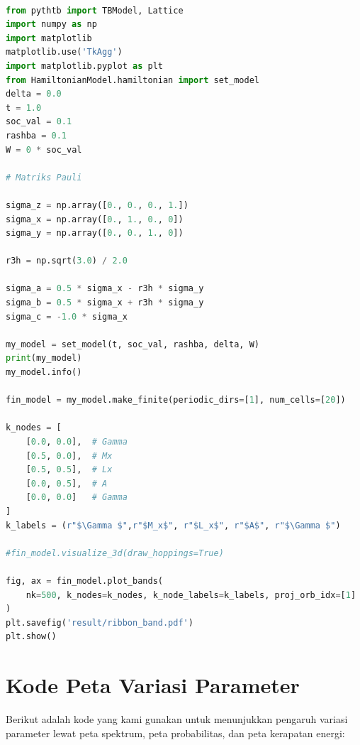 \begin{lstlisting}[language=Python, caption={Validasi \textit{Edge State}}, label={lst:vis-model}]

from pythtb import TBModel, Lattice
import numpy as np
import matplotlib
matplotlib.use('TkAgg')
import matplotlib.pyplot as plt
from HamiltonianModel.hamiltonian import set_model
delta = 0.0
t = 1.0
soc_val = 0.1
rashba = 0.1
W = 0 * soc_val

# Matriks Pauli

sigma_z = np.array([0., 0., 0., 1.])
sigma_x = np.array([0., 1., 0., 0])
sigma_y = np.array([0., 0., 1., 0])

r3h = np.sqrt(3.0) / 2.0

sigma_a = 0.5 * sigma_x - r3h * sigma_y
sigma_b = 0.5 * sigma_x + r3h * sigma_y
sigma_c = -1.0 * sigma_x

my_model = set_model(t, soc_val, rashba, delta, W)
print(my_model)
my_model.info()

fin_model = my_model.make_finite(periodic_dirs=[1], num_cells=[20])

k_nodes = [
    [0.0, 0.0],  # Gamma
    [0.5, 0.0],  # Mx
    [0.5, 0.5],  # Lx
    [0.0, 0.5],  # A
    [0.0, 0.0]   # Gamma
]
k_labels = (r"$\Gamma $",r"$M_x$", r"$L_x$", r"$A$", r"$\Gamma $")

#fin_model.visualize_3d(draw_hoppings=True)

fig, ax = fin_model.plot_bands(
    nk=500, k_nodes=k_nodes, k_node_labels=k_labels, proj_orb_idx=[1]
)
plt.savefig('result/ribbon_band.pdf')
plt.show()

\end{lstlisting}

\section{Kode Peta Variasi Parameter}
Berikut adalah kode yang kami gunakan untuk menunjukkan pengaruh variasi parameter lewat peta spektrum, peta probabilitas, dan peta kerapatan energi:

